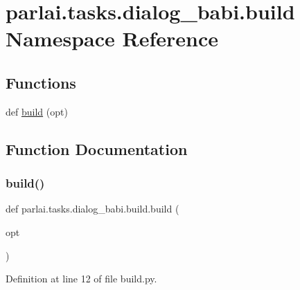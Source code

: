 \hypertarget{namespaceparlai_1_1tasks_1_1dialog__babi_1_1build}{}\section{parlai.\+tasks.\+dialog\+\_\+babi.\+build Namespace Reference}
\label{namespaceparlai_1_1tasks_1_1dialog__babi_1_1build}
\subsection*{Functions}
\begin{DoxyCompactItemize}
\item 
def \hyperlink{namespaceparlai_1_1tasks_1_1dialog__babi_1_1build_a27e45864cbef49db5548fccd56a918dd}{build} (opt)
\end{DoxyCompactItemize}


\subsection{Function Documentation}
\mbox{\label{namespaceparlai_1_1tasks_1_1dialog__babi_1_1build_a27e45864cbef49db5548fccd56a918dd}} 
\subsubsection{\texorpdfstring{build()}{build()}}
{\footnotesize\ttfamily def parlai.\+tasks.\+dialog\+\_\+babi.\+build.\+build (\begin{DoxyParamCaption}\item[{}]{opt }\end{DoxyParamCaption})}



Definition at line 12 of file build.\+py.

